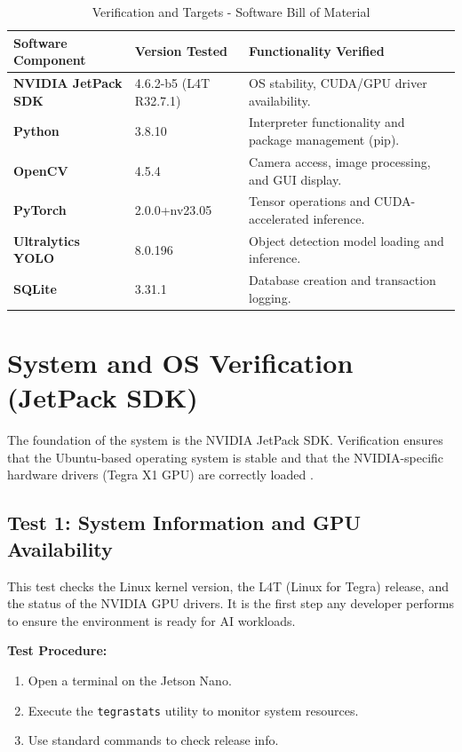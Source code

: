 \begin{table}[h]
	\centering
	\caption{Verification and Targets - Software Bill of Material\cite{Stu24, Ope24, PyT25}}
	\label{tab:sw_bom}
	\begin{tabular}{@{}llp{6cm}@{}}
		\toprule
		\textbf{Software Component} & \textbf{Version Tested} & \textbf{Functionality Verified} \\ \midrule
			\textbf{NVIDIA JetPack SDK} & 4.6.2-b5 (L4T R32.7.1) & OS stability, CUDA/GPU driver availability. \\
		\textbf{Python} & 3.8.10 & Interpreter functionality and package management (pip). \\
		\textbf{OpenCV} & 4.5.4 & Camera access, image processing, and GUI display. \\
		\textbf{PyTorch} & 2.0.0+nv23.05 & Tensor operations and CUDA-accelerated inference. \\
		\textbf{Ultralytics YOLO} & 8.0.196 & Object detection model loading and inference. \\
		\textbf{SQLite} & 3.31.1 & Database creation and transaction logging. \\
		\bottomrule
	\end{tabular}
\end{table}

\section{System and OS Verification (JetPack SDK)}

The foundation of the system is the NVIDIA JetPack SDK. Verification ensures that the Ubuntu-based operating system is stable and that the NVIDIA-specific hardware drivers (Tegra X1 GPU) are correctly loaded \cite{Stu24}.

\subsection{Test 1: System Information and GPU Availability}
This test checks the Linux kernel version, the L4T (Linux for Tegra) release, and the status of the NVIDIA GPU drivers. It is the first step any developer performs to ensure the environment is ready for AI workloads.

\textbf{Test Procedure:}
\begin{enumerate}
	\item Open a terminal on the Jetson Nano.
	\item Execute the \texttt{tegrastats} utility to monitor system resources.
	\item Use standard commands to check release info.
\end{enumerate}

